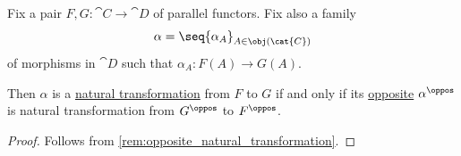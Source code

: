 \begin{proposition}\label{thm:opposite_natural_transformation}
  Fix a pair \( F, G: \cat{C} \to \cat{D} \) of parallel functors. Fix also a family
  \begin{equation*}
    \alpha = \seq{ \alpha_A }_{A \in \obj(\cat{C})}
  \end{equation*}
  of morphisms in \( \cat{D} \) such that \( \alpha_A: F(A) \to G(A) \).

  Then \( \alpha \) is a \hyperref[def:natural_transformation]{natural transformation} from \( F \) to \( G \) if and only if its \hyperref[def:opposite_natural_transformation]{opposite} \( \alpha^\oppos \) is natural transformation from \( G^\oppos \) to \( F^\oppos \).
\end{proposition}
\begin{proof}
  Follows from \cref{rem:opposite_natural_transformation}.
\end{proof}
